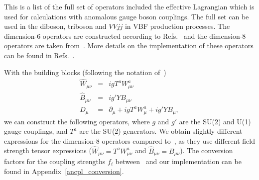 \documentclass[english,12pt]{article}
\begin{document}
This is a list of the full set of operators included the effective Lagrangian
which is used for calculations with anomalous gauge boson couplings.
The full set can be used in the diboson, triboson and $VVjj$ in VBF production
processes.
The dimension-6 operators are constructed according to Refs.~\cite{Hagiwara:1993qt,Hagiwara:1993ck} and
the dimension-8 operators are taken from~\cite{Eboli:2006wa}.
More details on the implementation of these operators can be found in 
Refs.~\cite{anomWW, anomVVV, anomVBF}.

\vskip6pt
\noindent
With the building blocks (following the notation of~\cite{Hagiwara:1993qt,Hagiwara:1993ck})
\begin{eqnarray}
 \widehat{W}_{\mu\nu} &=& i g T^{a} W^{a}_{\mu\nu} \nonumber \\
 \widehat{B}_{\mu\nu} &=& i g' Y B_{\mu \nu} \nonumber \\
  D_\mu &=& \partial_\mu + i g T^{a} W^{a}_\mu  + i g' Y B_\mu,
\end{eqnarray}
we can construct the following operators, where $g$ and $g'$ are the SU(2) 
and U(1) gauge couplings, and $T^{a}$ are the SU(2) generators.
We obtain slightly different expressions for the dimension-8 operators compared to~\cite{Eboli:2006wa},
as they use different field strength tensor expressions ($\widehat{W}_{\mu\nu} = T^{a} W^{a}_{\mu\nu}$
and $\widehat{B}_{\mu\nu} = B_{\mu \nu}$). The conversion factors for the coupling
strengths $f_i$ between~\cite{Eboli:2006wa} and our implementation can be found in
Appendix~\ref{ancpl_conversion}.
\end{document}
